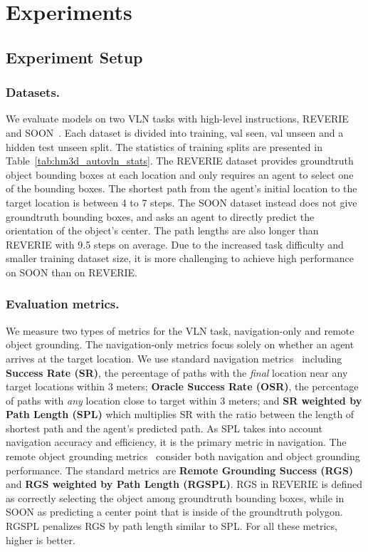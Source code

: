 \section{Experiments}

\subsection{Experiment Setup}

\subsubsection{Datasets.}
We evaluate models on two VLN tasks with high-level instructions, REVERIE~\cite{qi2020reverie} and SOON~\cite{zhu2021soon}.
Each dataset is divided into training, val seen, val unseen and a hidden test unseen split. 
The statistics of training splits are presented in Table~\ref{tab:hm3d_autovln_stats}.
The REVERIE dataset provides groundtruth object bounding boxes at each location and only requires an agent to select one of the bounding boxes. The shortest path from the agent's initial location to the target location is between 4 to 7 steps.
The SOON dataset instead does not give groundtruth bounding boxes, and asks an agent to directly predict the orientation of the object's center. The path lengths are also longer than REVERIE with 9.5 steps on average.
Due to the increased task difficulty and smaller training dataset size, it is more challenging to achieve high performance on SOON  than on REVERIE. 

\subsubsection{Evaluation metrics.}
We measure two types of metrics for the VLN task, navigation-only and remote object grounding.
The navigation-only metrics focus solely on whether an agent arrives at the target location. We use standard navigation metrics~\cite{anderson2018vision} including
\textbf{Success Rate (SR)}, the percentage of paths with the \emph{final} location near any target locations within 3 meters; 
\textbf{Oracle Success Rate (OSR)}, the percentage of paths with \emph{any} location close to target within 3 meters; and
\textbf{SR weighted by Path Length (SPL)} which multiplies SR with the ratio between the length of shortest path and the agent's predicted path.
As SPL takes into account navigation accuracy and efficiency, it is the primary metric in navigation.
The remote object grounding metrics~\cite{qi2020reverie} consider both navigation and object grounding performance.
The standard metrics are \textbf{Remote Grounding Success (RGS)} and \textbf{RGS weighted by Path Length (RGSPL)}.
RGS in REVERIE is defined as correctly selecting the object among groundtruth bounding boxes, while in SOON as predicting a center point that is inside of the groundtruth polygon.
RGSPL penalizes RGS by path length similar to SPL.
For all these metrics, higher is better.

